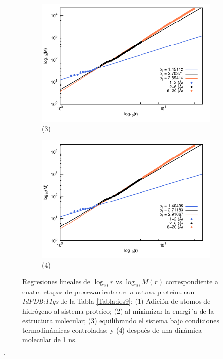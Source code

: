 \begin{figure}[H]
	\vspace{0cm} %
	
	\hspace{-0.3cm} 
	\begin{subfigure}{0.49\textwidth}
		\centering
		\includegraphics[width=\linewidth,page=1]{graphs/PDBs/11gs/11gsEq.pdf}
		\caption{(3)}
	\end{subfigure}
	\hspace{0.2cm}
	\begin{subfigure}{0.49\textwidth} %
		\centering
		\includegraphics[width=\linewidth,page=1]{graphs/PDBs/11gs/11gs1ns.pdf}
		\caption{(4)}
	\end{subfigure}
	
	\caption{Regresiones lineales de $\log_{10}r$ vs $\log_{10}M(r)$ correspondiente a cuatro etapas de procesamiento de la octava prote\'{i}na con \textit{IdPDB:11gs} de la Tabla \ref{Tabla:ids9}: (1) Adici\'{o}n de \'{a}tomos de hidr\'{o}geno al sistema proteico; (2) al minimizar la energ\'{i´}a de la estructura molecular; (3) equilibrando el sistema bajo condiciones termodin\'{a}micas controladas; y (4) despu\'{e}s de una din\'{a}mica molecular de 1 ns.}
	\label{fig:11gs}
\end{figure}
´


